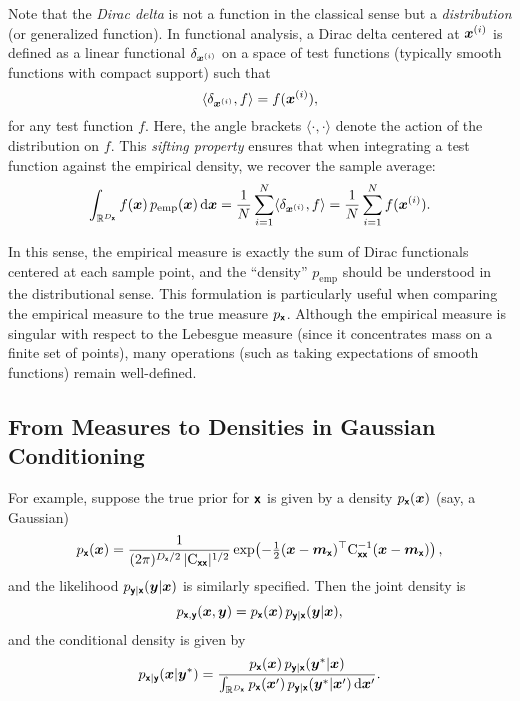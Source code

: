 \documentclass[wcp]{jmlr} %
\begin{document}
Note that the \emph{Dirac delta} is not a function in the classical sense but a \emph{distribution} (or generalized function). In functional analysis, a Dirac delta centered at \(\boldsymbol{x}^{(i)}\) is defined as a linear functional \(\delta_{\boldsymbol{x}^{(i)}}\) on a space of test functions (typically smooth functions with compact support) such that
\begin{equation}
    \langle \delta_{\boldsymbol{x}^{(i)}}, f \rangle = f(\boldsymbol{x}^{(i)}),
\end{equation}
for any test function \(f\). Here, the angle brackets \(\langle \cdot,\cdot \rangle\) denote the action of the distribution on \(f\). This \emph{sifting property} ensures that when integrating a test function against the empirical density, we recover the sample average:
\begin{equation}
    \int_{\mathbb{R}^{D_{\boldsymbol{\mathsf{x}}}}} f(\boldsymbol{x})\,p_{\text{emp}}(\boldsymbol{x})\,\mathrm{d}\boldsymbol{x}
    = \frac{1}{N} \sum_{i=1}^N \langle \delta_{\boldsymbol{x}^{(i)}}, f \rangle
    = \frac{1}{N} \sum_{i=1}^N f(\boldsymbol{x}^{(i)}).
\end{equation}

In this sense, the empirical measure is exactly the sum of Dirac functionals centered at each sample point, and the “density” \(p_{\text{emp}}\) should be understood in the distributional sense. This formulation is particularly useful when comparing the empirical measure to the true measure \(p_{\boldsymbol{\mathsf{x}}}\). Although the empirical measure is singular with respect to the Lebesgue measure (since it concentrates mass on a finite set of points), many operations (such as taking expectations of smooth functions) remain well-defined.

\subsection*{From Measures to Densities in Gaussian Conditioning}

For example, suppose the true prior for \(\boldsymbol{\mathsf{x}}\) is given by a density \(p_{\boldsymbol{\mathsf{x}}}(\boldsymbol{x})\) (say, a Gaussian)
\[
    p_{\boldsymbol{\mathsf{x}}}(\boldsymbol{x}) = \frac{1}{(2\pi)^{D_{\boldsymbol{\mathsf{x}}}/2} \,|\mathrm{C}_{\boldsymbol{\mathsf{xx}}}|^{1/2}} \exp\!\left(-\tfrac{1}{2}(\boldsymbol{x}-\boldsymbol{m}_{\boldsymbol{\mathsf{x}}})^\top \mathrm{C}_{\boldsymbol{\mathsf{xx}}}^{-1} (\boldsymbol{x}-\boldsymbol{m}_{\boldsymbol{\mathsf{x}}})\right),
\]
and the likelihood \(p_{\boldsymbol{\mathsf{y}}|\boldsymbol{\mathsf{x}}}(\boldsymbol{y}|\boldsymbol{x})\) is similarly specified. Then the joint density is
\begin{equation}
    p_{\boldsymbol{\mathsf{x}},\boldsymbol{\mathsf{y}}}(\boldsymbol{x},\boldsymbol{y})
    = p_{\boldsymbol{\mathsf{x}}}(\boldsymbol{x})\,p_{\boldsymbol{\mathsf{y}}|\boldsymbol{\mathsf{x}}}(\boldsymbol{y}|\boldsymbol{x}),
\end{equation}
and the conditional density is given by
\begin{equation}
    p_{\boldsymbol{\mathsf{x}}|\boldsymbol{\mathsf{y}}}(\boldsymbol{x}|\boldsymbol{y}^*)
    = \frac{p_{\boldsymbol{\mathsf{x}}}(\boldsymbol{x})\,p_{\boldsymbol{\mathsf{y}}|\boldsymbol{\mathsf{x}}}(\boldsymbol{y}^*|\boldsymbol{x})}{\int_{\mathbb{R}^{D_{\boldsymbol{\mathsf{x}}}}} p_{\boldsymbol{\mathsf{x}}}(\boldsymbol{x}')\,p_{\boldsymbol{\mathsf{y}}|\boldsymbol{\mathsf{x}}}(\boldsymbol{y}^*|\boldsymbol{x}')\,\mathrm{d}\boldsymbol{x}'}.
\end{equation}
\end{document}
